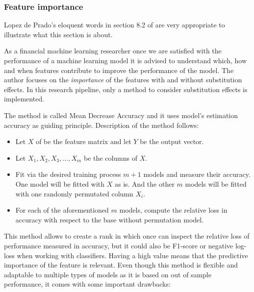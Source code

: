 \subsubsection{Feature importance}
\label{sec:methods_pipeline_feature_importance}

Lopez de Prado's eloquent words in section 8.2 of \cite{lopez_de_prado} are very
appropriate to illustrate what this section is about.


As a financial machine learning researcher once we are satisfied
with the performance of a machine learning model it is advised to understand
which, how and when features contribute to improve the performance of the model.
The author focuses on the \emph{importance} of the features with and without
substitution effects. In this research pipeline, only a method to consider
substitution effects is implemented.

The method is called Mean Decrease Accuracy and it uses model's estimation
accuracy as guiding principle. Description of the method follows:

\begin{itemize}
  \item Let $X$ of be the feature matrix and let $Y$ be the output vector.
  \item Let $X_1, X_2, X_3, ..., X_m$ be the columns of $X$.
  \item Fit via the desired training process $m + 1$ models and measure their
        accuracy. One model will be fitted with $X$ as is. And the other $m$
        models will be fitted with one randomly permutated column $X_i$.
  \item For each of the aforementioned $m$ models, compute the relative loss in
        accuracy with respect to the base without permutation model. 
\end{itemize}

This method allows to create a rank in which once can inspect the relative loss
of performance measured in accuracy, but it could also be F1-score or
negative log-loss when working with classifiers. Having a high value means
that the predictive importance of the feature is relevant. Even though this method
is flexible and adaptable to multiple types of models as it is based on out of
sample performance, it comes with some important drawbacks:

